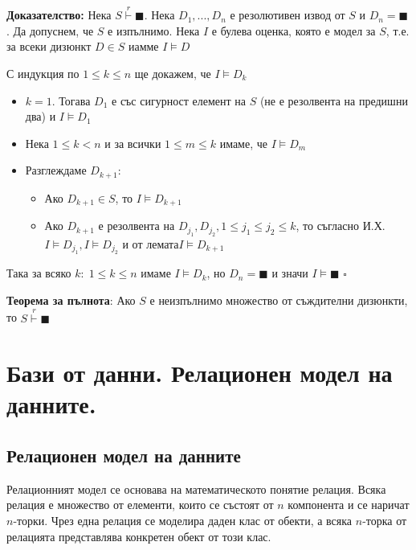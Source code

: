 \documentclass{article}
\renewcommand{\\}{\newline}
\newcommand{\doc}{\textbf{Доказателство: }}
\newcommand{\proven}{\hfill $\square$}
\begin{document}
\doc Нека \(S \overset{r}{\vdash} \blacksquare\). Нека \(D_1, ..., D_n\) е резолютивен извод от \(S\) и \(D_{n} = \blacksquare\). Да допуснем, че \(S\) е изпълнимо. Нека \(I\) е булева оценка, която е модел за \(S\), т.е. за всеки дизюнкт \(D \in S\) иамме \(I \vDash D\) 

С индукция по \(1 \leq k \leq n\) ще докажем, че \(I \vDash D_k\) 

\begin{itemize}
    \item \(k=1\). Тогава \(D_1\) е със сигурност елемент на \(S\) (не е резолвента на предишни два) и \(I \vDash D_1\) 
    \item Нека \(1 \leq k < n\) и за всички \(1 \leq m \leq k\) имаме, че \(I \vDash D_m\) 
    \item Разглеждаме \(D_{k+1}\):
      \begin{itemize}
          \item Ако \(D_{k+1}\in S\), то \(I \vDash D_{k+1}\) 
          \item Ако \(D_{k+1}\) е резолвента на \(D_{j_1}, D_{j_2}, 1 \leq j_1 \leq j_2 \leq k\), то съгласно И.Х. \(I \vDash D_{j_1}, I \vDash D_{j_2}\) и от лемата\(I \vDash D_{k+1}\)     
      \end{itemize}
\end{itemize}

Така за всяко \(k:\; 1 \leq k \leq n\) имаме \(I \vDash D_k\), но \(D_{n} = \blacksquare\) и значи \(I \vDash \blacksquare\) \Lightning \proven     



\textbf{Теорема за пълнота}: Ако \(S\) е неизпълнимо множество от съждителни дизюнкти, то \(S \overset{r}{\vdash} \blacksquare\)   
\newpage


\section{Бази от данни. Релационен модел на данните.}

\subsection{Релационен модел на данните}
Релационният модел се основава на математическото понятие релация. Всяка релация е множество от елементи, които се състоят от $n$ компонента и се наричат $n$-торки. Чрез една релация се моделира даден клас от обекти, а всяка $n$-торка от релацията представлява конкретен обект от този клас. 
\end{document}

